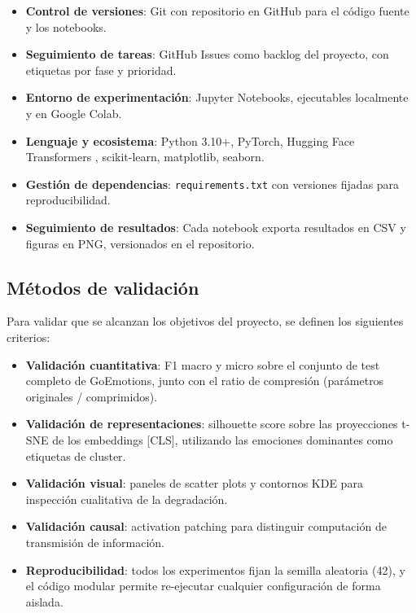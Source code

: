 \documentclass[11pt, a4paper]{article}
\begin{document}
\begin{itemize}[nosep]
    \item \textbf{Control de versiones}: Git con repositorio en GitHub para el código fuente y los notebooks.
    \item \textbf{Seguimiento de tareas}: GitHub Issues como backlog del proyecto, con etiquetas por fase y prioridad.
    \item \textbf{Entorno de experimentación}: Jupyter Notebooks, ejecutables localmente y en Google Colab.
    \item \textbf{Lenguaje y ecosistema}: Python 3.10+, PyTorch, Hugging Face Transformers \cite{wolf2020transformers}, scikit-learn, matplotlib, seaborn.
    \item \textbf{Gestión de dependencias}: \texttt{requirements.txt} con versiones fijadas para reproducibilidad.
    \item \textbf{Seguimiento de resultados}: Cada notebook exporta resultados en CSV y figuras en PNG, versionados en el repositorio.
\end{itemize}

\subsection{Métodos de validación}

Para validar que se alcanzan los objetivos del proyecto, se definen los siguientes criterios:

\begin{itemize}[nosep]
    \item \textbf{Validación cuantitativa}: F1 macro y micro sobre el conjunto de test completo de GoEmotions, junto con el ratio de compresión (parámetros originales / comprimidos).
    \item \textbf{Validación de representaciones}: silhouette score sobre las proyecciones t-SNE de los embeddings [CLS], utilizando las emociones dominantes como etiquetas de cluster.
    \item \textbf{Validación visual}: paneles de scatter plots y contornos KDE para inspección cualitativa de la degradación.
    \item \textbf{Validación causal}: activation patching para distinguir computación de transmisión de información.
    \item \textbf{Reproducibilidad}: todos los experimentos fijan la semilla aleatoria (42), y el código modular permite re-ejecutar cualquier configuración de forma aislada.
\end{itemize}
\end{document}
